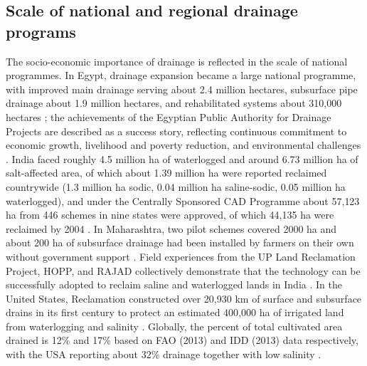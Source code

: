 \documentclass[11pt]{article}
\begin{document}
\subsection{Scale of national and regional drainage programs}
The socio-economic importance of drainage is reflected in the scale of national programmes. In Egypt, drainage expansion became a large national programme, with improved main drainage serving about 2.4 million hectares, subsurface pipe drainage about 1.9 million hectares, and rehabilitated systems about 310{,}000 hectares \parencite{AbdelDayem2007}; the achievements of the Egyptian Public Authority for Drainage Projects are described as a success story, reflecting continuous commitment to economic growth, livelihood and poverty reduction, and environmental challenges \parencite{AbdelDayem2007}. India faced roughly 4.5 million ha of waterlogged and around 6.73 million ha of salt-affected area, of which about 1.39 million ha were reported reclaimed countrywide (1.3 million ha sodic, 0.04 million ha saline-sodic, 0.05 million ha waterlogged), and under the Centrally Sponsored CAD Programme about 57{,}123 ha from 446 schemes in nine states were approved, of which 44{,}135 ha were reclaimed by 2004 \parencite{Gopalakrishnan2007}. In Maharashtra, two pilot schemes covered 2000 ha and about 200 ha of subsurface drainage had been installed by farmers on their own without government support \parencite{Gopalakrishnan2007}. Field experiences from the UP Land Reclamation Project, HOPP, and RAJAD collectively demonstrate that the technology can be successfully adopted to reclaim saline and waterlogged lands in India \parencite{Gopalakrishnan2007}. In the United States, Reclamation constructed over 20{,}930 km of surface and subsurface drains in its first century to protect an estimated 400{,}000 ha of irrigated land from waterlogging and salinity \parencite{TeKrony2004}. Globally, the percent of total cultivated area drained is 12\% and 17\% based on FAO (2013) and IDD (2013) data respectively, with the USA reporting about 32\% drainage together with low salinity \parencite{Valipour2014}.
\end{document}

